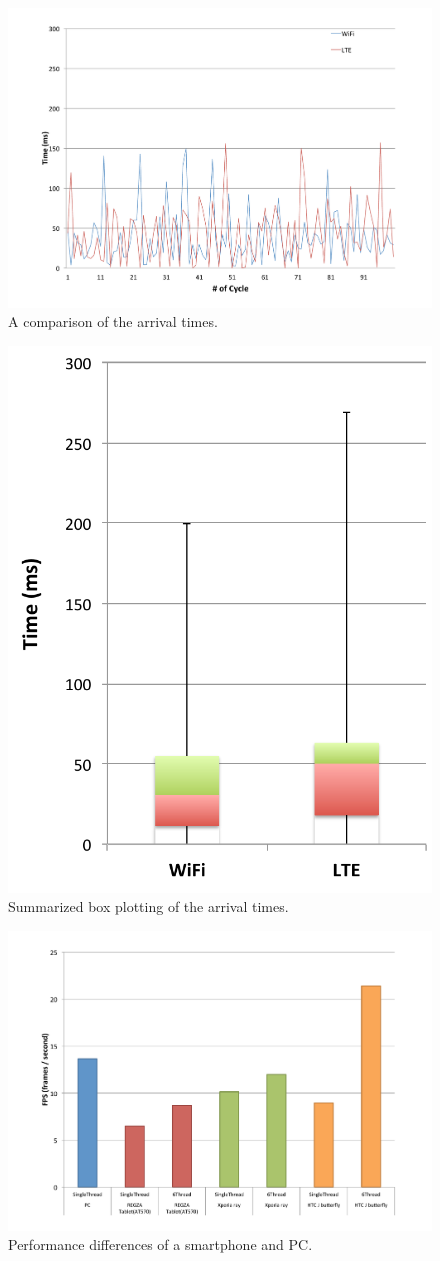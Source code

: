 \begin{figure}[!t]
 \centering
 \includegraphics[width=0.8\hsize]{fig/No12_TIPiC_serv_cycle_compare_WiFi_and_LTE.pdf}
 \caption{A comparison of the arrival times.}
 \label{fig:no12}
\end{figure}

\begin{figure}[!t]
 \centering
 \includegraphics[width=0.5\hsize]{fig/No13_TIPiC_boxplot_compare_WiFi_and_LTE.pdf}
 \caption{Summarized box plotting of the arrival times.}
 \label{fig:no13}
\end{figure}

\begin{figure}[!t]
 \centering
 \includegraphics[width=0.8\hsize]{fig/No14_Android_and_PC_benchmarck.pdf}
 \caption{Performance differences of a smartphone and PC.}
 \label{fig:no14}
\end{figure}
